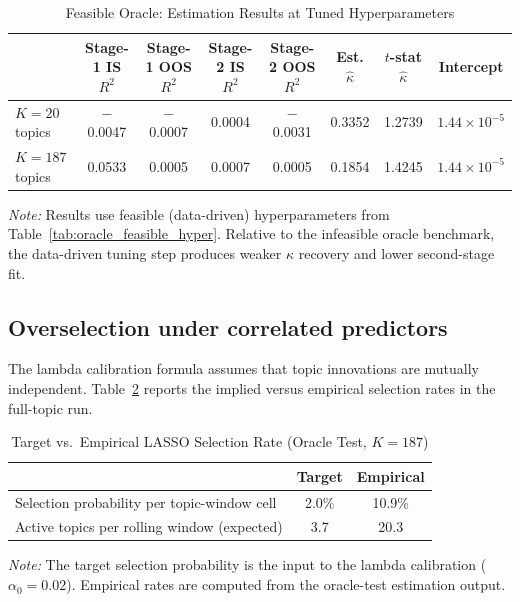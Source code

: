 \documentclass[11pt]{article}
\begin{document}
\begin{table}[H]
\centering
\caption{Feasible Oracle: Estimation Results at Tuned Hyperparameters}
\label{tab:oracle_feasible_results}
\begin{tabularx}{\textwidth}{@{}>{\small}lccccccc@{}}
\toprule
 & \multicolumn{1}{c}{Stage-1 IS $R^2$}
 & \multicolumn{1}{c}{Stage-1 OOS $R^2$}
 & \multicolumn{1}{c}{Stage-2 IS $R^2$}
 & \multicolumn{1}{c}{Stage-2 OOS $R^2$}
 & \multicolumn{1}{c}{Est. $\hat\kappa$}
 & \multicolumn{1}{c}{$t$-stat $\hat\kappa$}
 & \multicolumn{1}{c}{Intercept} \\
\midrule
$K = 20$ topics  & $-$0.0047 & $-$0.0007 & 0.0004 & $-$0.0031 & 0.3352 & 1.2739 & $1.44 \times 10^{-5}$ \\
$K = 187$ topics & 0.0533    & 0.0005    & 0.0007 & 0.0005    & 0.1854 & 1.4245 & $1.44 \times 10^{-5}$ \\
\bottomrule
\end{tabularx}
\medskip
\begin{minipage}{\textwidth}
\footnotesize
\textit{Note:} Results use feasible (data-driven) hyperparameters from
Table~\ref{tab:oracle_feasible_hyper}. Relative to the infeasible oracle benchmark,
the data-driven tuning step produces weaker $\kappa$ recovery and lower second-stage fit.
\end{minipage}
\end{table}

\subsection*{Overselection under correlated predictors}

The lambda calibration formula assumes that topic innovations are mutually independent.
Table~\ref{tab:oracle_selection} reports the implied versus empirical selection rates in the
full-topic run.

\begin{table}[H]
\centering
\caption{Target vs.\ Empirical LASSO Selection Rate (Oracle Test, $K = 187$)}
\label{tab:oracle_selection}
\begin{tabular}{lcc}
\toprule
 & Target & Empirical \\
\midrule
Selection probability per topic-window cell & 2.0\% & 10.9\% \\
Active topics per rolling window (expected) & 3.7   & 20.3  \\
\bottomrule
\end{tabular}
\medskip
\begin{minipage}{0.9\textwidth}
\footnotesize
\textit{Note:} The target selection probability is the input to the lambda calibration
($\alpha_0 = 0.02$).
Empirical rates are computed from the oracle-test estimation output.
\end{minipage}
\end{table}
\end{document}
